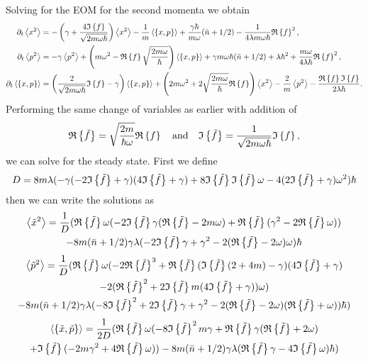 Solving for the EOM for the second momenta we obtain
\begin{align}
    \dt \expval{x^2} &= -\left(\gamma + \frac{4\im{f}}{\sqrt{2 m \omega \hbar}}\right) \expval{x^2} - \frac{1}{m} \expval{\acomm{x}{p}} + \frac{\gamma \hbar}{m \omega} (\nbar + 1/2) - \frac{1}{4\lambda m \omega \hbar} \re{f}^2,\\
    \dt \expval{p^2} &=  -\gamma \expval{p^2} + \left( m\omega^2 - \re{f} \sqrt{\frac{2m \omega}{\hbar}} \right)\expval{\acomm{x}{p}} + \gamma m \omega \hbar (\nbar + 1/2) + \lambda \hbar^2 + \frac{m \omega}{4 \lambda \hbar}\re{f}^2 ,\\
    \dt \expval{\acomm{x}{p}} &= \left(\frac{2}{\sqrt{2m \omega \hbar}}\im{f} - \gamma  \right)\expval{\acomm{x}{p}} + \left(2 m \omega^2 + 2 \sqrt{\frac{2 m \omega}{\hbar}}\re{f} \right) \expval{x^2} - \frac{2}{m} \expval{p^2} - \frac{\re{f} \im{f}}{2 \lambda \hbar}.
\end{align}
Performing the same change of variables as earlier with addition of 
\begin{equation}
    \mathfrak{R}\left\{\tilde{f}\right\} = \sqrt{\frac{2 m}{\hbar \omega}} \mathfrak{R}\left\{f\right\} \quad \text{and} \quad \mathfrak{I}\left\{\tilde{f}\right\} = \frac{1}{\sqrt{2 m \omega \hbar}} \mathfrak{I}\left\{f\right\}, 
\end{equation}
we can solve for the steady state. First we define
\begin{equation}
    D = 8m\lambda ( -\gamma ( -2\mathfrak{I}\left\{\tilde{f}\right\} + \gamma ) (4\mathfrak{I}\left\{\tilde{f}\right\} + \gamma)+ 8\mathfrak{I}\left\{\tilde{f}\right\}\mathfrak{I}\left\{\tilde{f}\right\} \omega - 4 (2\mathfrak{I}\left\{\tilde{f}\right\} + \gamma)\omega^2 )\hbar
\end{equation}
then we can write the solutions as
\begin{multline}
    \expval{\tilde{x}^2} = \frac{1}{D} (\mathfrak{R}\left\{\tilde{f}\right\} \omega (-2 \mathfrak{I}\left\{\tilde{f}\right\} \gamma ( \mathfrak{R}\left\{\tilde{f}\right\} - 2m \omega ) + \mathfrak{R}\left\{\tilde{f}\right\} (\gamma^2 - 2 \mathfrak{R}\left\{\tilde{f}\right\} \omega) ) \\ -8m (\bar{n} + 1/2)\gamma \lambda(-2\mathfrak{I}\left\{\tilde{f}\right\}\gamma + \gamma^2 - 2(\mathfrak{R}\left\{\tilde{f}\right\}- 2\omega)\omega )\hbar
\end{multline}
\begin{multline}
    \expval{\tilde{p}^2} = \frac{1}{D} (\mathfrak{R}\left\{\tilde{f}\right\} \omega ( -2 \mathfrak{R}\left\{\tilde{f}\right\}^3 + \mathfrak{R}\left\{\tilde{f}\right\} ( \mathfrak{I}\left\{\tilde{f}\right\}(2 + 4m) - \gamma )(4 \mathfrak{I}\left\{\tilde{f}\right\} + \gamma) \\- 2( \mathfrak{R}\left\{\tilde{f}\right\}^2 + 2 \mathfrak{I}\left\{\tilde{f}\right\} m (4 \mathfrak{I}\left\{\tilde{f}\right\} + \gamma) ) \omega ) \\- 8m(\bar{n} + 1/2) \gamma \lambda ( -8 \mathfrak{I}\left\{\tilde{f}\right\}^2 + 2 \mathfrak{I}\left\{\tilde{f}\right\} \gamma + \gamma^2 - 2 (\mathfrak{R}\left\{\tilde{f}\right\} - 2 \omega)(\mathfrak{R}\left\{\tilde{f}\right\} + \omega) ) \hbar
    ) 
\end{multline}
\begin{multline}
    \expval{\acomm{\tilde{x}}{\tilde{p}}} = \frac{1}{2D} (\re{\tilde{f}} \omega ( -8 \im{\tilde{f}}^2 m \gamma + \re{\tilde{f}} \gamma (\re{\tilde{f}} + 2 \omega) \\+ \im{\tilde{f}} (-2 m \gamma^2 + 4 \re{\tilde{f}} \omega) ) - 8 m (\nbar + 1/2) \gamma \lambda (\re{\tilde{f}} \gamma - 4 \im{\tilde{f}} \omega) \hbar
    )
\end{multline}
